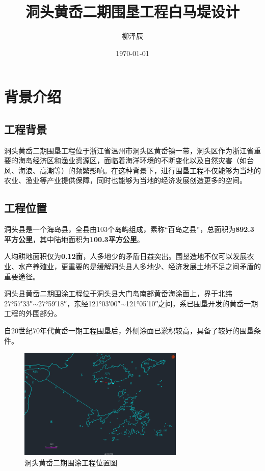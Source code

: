 \documentclass[UTF8, a4paper, 12pt]{ctexart} %
\title{洞头黄岙二期围垦工程白马堤设计}
\author{柳泽辰}
\date{\today}
\begin{document}
\maketitle
\newpage
\begin{abstract}
% 
\tableofcontents
\newpage
\end{abstract}

\section{背景介绍}

\subsection{工程背景}
洞头黄岙二期围垦工程位于浙江省温州市洞头区黄岙镇一带，洞头区作为浙江省重要的海岛经济区和渔业资源区，面临着海洋环境的不断变化以及自然灾害（如台风、海浪、高潮等）的频繁影响。在这种背景下，进行围垦工程不仅能够为当地的农业、渔业等产业提供保障，同时也能够为当地的经济发展创造更多的空间。
\subsection{工程位置}
洞头县是一个海岛县，全县由103个岛屿组成，素称“百岛之县”，总面积为\textbf{892.3平方公里}，其中陆地面积为\textbf{100.3平方公里}。

人均耕地面积仅为\textbf{0.12亩}，人多地少的矛盾日益突出。围垦造地不仅可以发展农业、水产养殖业，更重要的是缓解洞头县人多地少、经济发展土地不足之间矛盾的重要途径。

洞头县黄岙二期围涂工程位于洞头县大门岛南部黄岙海涂面上，界于北纬27°57′33″$\sim$27°59′18″，东经121°03′00″$\sim$121°05′10″之间，系已围垦开发的黄岙一期工程的外围部分。

自20世纪70年代黄岙一期工程围垦后，外侧涂面已淤积较高，具备了较好的围垦条件。
\begin{figure}[h]
    \centering
    \includegraphics[width=0.7\textwidth]{9.png}
    \caption{洞头黄岙二期围涂工程位置图}
    \label{fig:location}
    
\end{figure}
\end{document}
